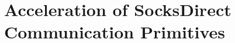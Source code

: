 \chapter{Acceleration of SocksDirect Communication Primitives}
\label{chapter:socksdirect}









